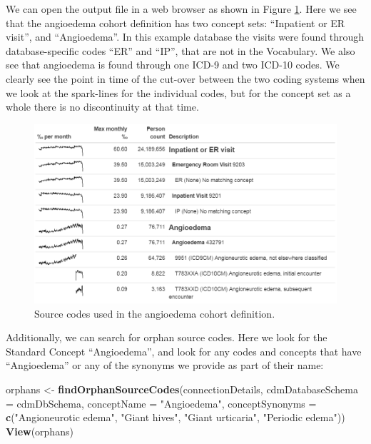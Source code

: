 \documentclass[11pt]{book}
\newenvironment{Shaded}{\begin{snugshade}}{\end{snugshade}}
\newcommand{\DataTypeTok}[1]{\textcolor[rgb]{0.13,0.29,0.53}{#1}}
\newcommand{\KeywordTok}[1]{\textcolor[rgb]{0.13,0.29,0.53}{\textbf{#1}}}
\newcommand{\NormalTok}[1]{#1}
\newcommand{\StringTok}[1]{\textcolor[rgb]{0.31,0.60,0.02}{#1}}
\theoremstyle{definition}
\theoremstyle{definition}
\theoremstyle{definition}
\theoremstyle{remark}
\begin{document}
We can open the output file in a web browser as shown in Figure \ref{fig:sourceCodesAngioedema}. Here we see that the angioedema cohort definition has two concept sets: ``Inpatient or ER visit'', and ``Angioedema''. In this example database the visits were found through database-specific codes ``ER'' and ``IP'', that are not in the Vocabulary. We also see that angioedema is found through one ICD-9 and two ICD-10 codes. We clearly see the point in time of the cut-over between the two coding systems when we look at the spark-lines for the individual codes, but for the concept set as a whole there is no discontinuity at that time.

\begin{figure}

{\centering \includegraphics[width=1\linewidth]{images/DataQuality/sourceCodesAngioedema} 

}

\caption{Source codes used in the angioedema cohort definition.}\label{fig:sourceCodesAngioedema}
\end{figure}

Additionally, we can search for orphan source codes. Here we look for the Standard Concept ``Angioedema'', and look for any codes and concepts that have ``Angioedema'' or any of the synonyms we provide as part of their name:

\begin{Shaded}
\begin{Highlighting}[]
\NormalTok{orphans <-}\StringTok{ }\KeywordTok{findOrphanSourceCodes}\NormalTok{(connectionDetails,}
                                 \DataTypeTok{cdmDatabaseSchema =}\NormalTok{ cdmDbSchema,}
                                 \DataTypeTok{conceptName =} \StringTok{"Angioedema"}\NormalTok{,}
                                 \DataTypeTok{conceptSynonyms =} \KeywordTok{c}\NormalTok{(}\StringTok{"Angioneurotic edema"}\NormalTok{,}
                                                     \StringTok{"Giant hives"}\NormalTok{,}
                                                     \StringTok{"Giant urticaria"}\NormalTok{,}
                                                     \StringTok{"Periodic edema"}\NormalTok{))}
\KeywordTok{View}\NormalTok{(orphans)}
\end{Highlighting}
\end{Shaded}
\end{document}
